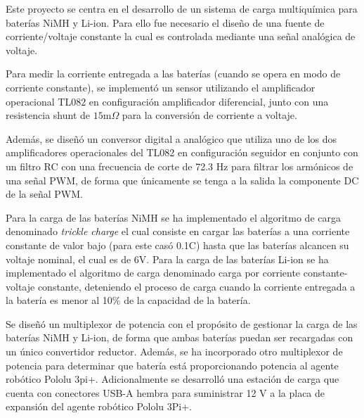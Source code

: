 Este proyecto se centra en el desarrollo de un sistema de carga multiquímica para baterías NiMH y Li-ion.
Para ello fue necesario el diseño de  una fuente de corriente/voltaje constante 
la cual es  controlada mediante una señal analógica de voltaje.

Para medir la corriente entregada a las baterías (cuando se opera en modo de
corriente constante), se implementó un sensor utilizando el amplificador
operacional TL082 en configuración amplificador diferencial, 
junto con una resistencia shunt de $15 \text{m}\Omega$ para la conversión de corriente a
voltaje.

Además, se diseñó un conversor digital a analógico que utiliza
uno de los dos amplificadores operacionales del TL082 en configuración seguidor
en conjunto con un filtro RC con una frecuencia de corte de 72.3 Hz para filtrar
los armónicos de una señal PWM, de forma que únicamente se tenga a la salida la
componente DC de la señal PWM.

Para la carga de las baterías NiMH se ha implementado el algoritmo de carga 
denominado \textit{trickle charge} el cual consiste en cargar las baterías
a una corriente constante de valor bajo (para este casó 0.1C) hasta que las
baterías alcancen su voltaje nominal, el cual es de 6V. Para la carga de las baterías 
Li-ion se ha implementado el algoritmo de carga
denominado carga por corriente constante-voltaje constante, deteniendo el proceso
de carga cuando la corriente entregada a la batería es menor al 10\% de la capacidad
de la batería.


Se diseñó un multiplexor de potencia con el propósito de gestionar
la carga de las baterías NiMH y
Li-ion, de forma que ambas baterías puedan ser recargadas con un único convertidor
reductor. Además, se ha incorporado otro multiplexor 
de potencia para determinar que batería está proporcionando potencia al 
agente robótico Pololu 3pi+. Adicionalmente se desarrolló una estación de carga que cuenta con conectores USB-A
hembra para suministrar 12 V a la placa de expansión del agente robótico Pololu 3Pi+.


